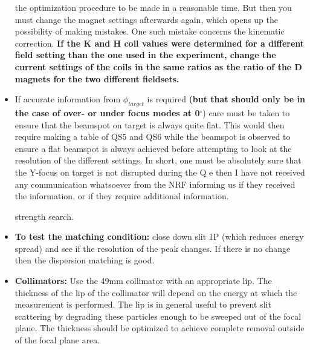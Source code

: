 \documentclass[11pt]{report}
\begin{document}
\begin{itemize}
      the optimization procedure to be made in a reasonable time.
      But then you must change the magnet settings afterwards again, which opens up
      the possibility of making mistakes. One such mistake concerns the kinematic correction.
      {\bf If the K and H coil values were determined for a different field
      setting than the one used in the experiment, change the current
      settings of the coils in the same ratios as the ratio of the D magnets
      for the two different fieldsets.}
\item If accurate information from $\phi_{target}$ is required 
      {\bf (but that should only be in the case of over- or under focus modes at 
      0$^{\circ}$}) 
      care must be taken to ensure that the beamspot on target is always
      quite flat. This would then require making a table of QS5 and QS6 
      while the beamspot is observed to ensure 
      a flat beamspot is always achieved before attempting to look at
      the resolution of the different settings.
      In short, one must be absolutely sure that the Y-focus on target
      is not disrupted during the Q e then I have not received any communication whatsoever from the NRF informing us if they received the information, or if they require additional information.

strength search.



\item {\bf To test the matching condition:} close down slit 1P (which reduces energy spread)
      and see if the resolution of the peak changes. If there is no change
      then the dispersion matching is good.
\item {\bf Collimators:} Use the 49mm collimator with an appropriate lip. 
      The thickness of the lip of
      the collimator will depend on the energy at which the measurement is performed.
      The lip is in general useful to prevent slit scattering by degrading these particles
      enough to be sweeped out of the focal plane. The thickness should 
      be optimized to achieve complete removal outside of the focal plane area.


\end{itemize}
\end{document}
